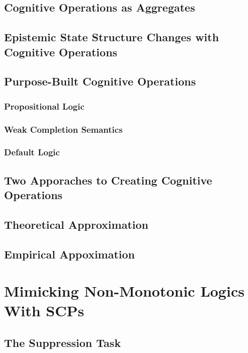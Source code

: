 \documentclass[
11pt, %
english, %
singlespacing, %
headsepline, %
]{MastersDoctoralThesis} %
\begin{document}
\section{Cognitive Operations as Aggregates}
\section{Epistemic State Structure Changes with Cognitive Operations}
\section{Purpose-Built Cognitive Operations}
\subsection{Propositional Logic}
\subsection{Weak Completion Semantics}
\subsection{Default Logic}
\section{Two Apporaches to Creating Cognitive Operations}
\section{Theoretical Approximation}
\section{Empirical Appoximation}

\chapter{Mimicking Non-Monotonic Logics With SCPs}

\section{The Suppression Task}
\end{document}
